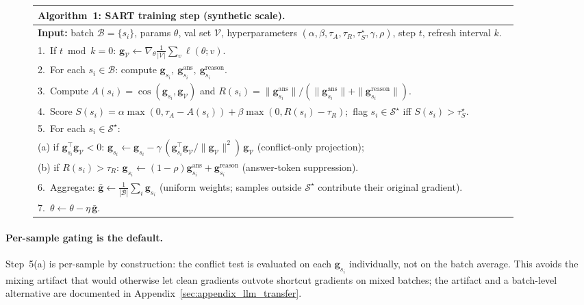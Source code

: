 \begin{figure}[h]
\centering
\small
\begin{tabular}{p{0.90\linewidth}}
\toprule
\textbf{Algorithm~1: SART training step (synthetic scale).}\\
\midrule
\textbf{Input:} batch $\mathcal{B}{=}\{s_i\}$, params $\theta$, val set $\mathcal{V}$, hyperparameters $(\alpha,\beta,\tau_A,\tau_R,\tau_S^\star,\gamma,\rho)$, step $t$, refresh interval $k$.\\
1.~If $t \bmod k = 0$: $\mathbf{g}_{\mathcal{V}} \leftarrow \nabla_\theta \tfrac{1}{|\mathcal{V}|}\sum_v \ell(\theta;v)$.\\
2.~For each $s_i \in \mathcal{B}$: compute $\mathbf{g}_{s_i},\ \mathbf{g}_{s_i}^{\mathrm{ans}},\ \mathbf{g}_{s_i}^{\mathrm{reason}}$.\\
3.~Compute $A(s_i){=}\cos(\mathbf{g}_{s_i},\mathbf{g}_{\mathcal{V}})$ and $R(s_i){=}\|\mathbf{g}_{s_i}^{\mathrm{ans}}\|/(\|\mathbf{g}_{s_i}^{\mathrm{ans}}\|{+}\|\mathbf{g}_{s_i}^{\mathrm{reason}}\|)$.\\
4.~Score $S(s_i){=}\alpha\max(0,\tau_A{-}A(s_i))+\beta\max(0,R(s_i){-}\tau_R)$;\ flag $s_i \in \mathcal{S}^\star$ iff $S(s_i){>}\tau_S^\star$.\\
5.~For each $s_i \in \mathcal{S}^\star$: \\
\quad (a) if $\mathbf{g}_{s_i}^\top \mathbf{g}_{\mathcal{V}} < 0$: $\mathbf{g}_{s_i} \leftarrow \mathbf{g}_{s_i}-\gamma\,(\mathbf{g}_{s_i}^\top\mathbf{g}_{\mathcal{V}}/\|\mathbf{g}_{\mathcal{V}}\|^2)\,\mathbf{g}_{\mathcal{V}}$ (conflict-only projection); \\
\quad (b) if $R(s_i){>}\tau_R$: $\mathbf{g}_{s_i} \leftarrow (1{-}\rho)\mathbf{g}_{s_i}^{\mathrm{ans}}{+}\mathbf{g}_{s_i}^{\mathrm{reason}}$ (answer-token suppression).\\
6.~Aggregate: $\bar{\mathbf{g}}\leftarrow \tfrac{1}{|\mathcal{B}|}\sum_i \mathbf{g}_{s_i}$ (uniform weights; samples outside $\mathcal{S}^\star$ contribute their original gradient).\\
7.~$\theta \leftarrow \theta - \eta\,\bar{\mathbf{g}}$.\\
\bottomrule
\end{tabular}
\label{alg:sart}
\end{figure}

\paragraph{Per-sample gating is the default.} Step~5(a) is per-sample by construction: the conflict test is evaluated on each $\mathbf{g}_{s_i}$ individually, not on the batch average. This avoids the mixing artifact that would otherwise let clean gradients outvote shortcut gradients on mixed batches; the artifact and a batch-level alternative are documented in Appendix~\ref{sec:appendix_llm_transfer}.

